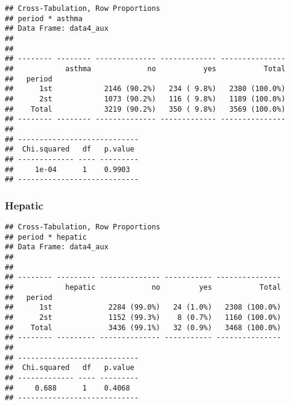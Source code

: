 \documentclass[
]{article}
\newenvironment{Shaded}{\begin{snugshade}}{\end{snugshade}}
\newcommand{\DataTypeTok}[1]{\textcolor[rgb]{0.13,0.29,0.53}{#1}}
\newcommand{\KeywordTok}[1]{\textcolor[rgb]{0.13,0.29,0.53}{\textbf{#1}}}
\newcommand{\NormalTok}[1]{#1}
\newcommand{\OperatorTok}[1]{\textcolor[rgb]{0.81,0.36,0.00}{\textbf{#1}}}
\newcommand{\OtherTok}[1]{\textcolor[rgb]{0.56,0.35,0.01}{#1}}
\newcommand{\StringTok}[1]{\textcolor[rgb]{0.31,0.60,0.02}{#1}}
\begin{document}
\begin{Shaded}
\end{Shaded}

\begin{verbatim}
## Cross-Tabulation, Row Proportions  
## period * asthma  
## Data Frame: data4_aux  
## 
## 
## -------- -------- -------------- ------------- ---------------
##            asthma             no           yes           Total
##   period                                                      
##      1st            2146 (90.2%)   234 ( 9.8%)   2380 (100.0%)
##      2st            1073 (90.2%)   116 ( 9.8%)   1189 (100.0%)
##    Total            3219 (90.2%)   350 ( 9.8%)   3569 (100.0%)
## -------- -------- -------------- ------------- ---------------
## 
## ----------------------------
##  Chi.squared   df   p.value 
## ------------- ---- ---------
##     1e-04      1    0.9903  
## ----------------------------
\end{verbatim}

\hypertarget{hepatic-2}{%
\subsubsection{Hepatic}\label{hepatic-2}}

\begin{Shaded}
\end{Shaded}

\begin{verbatim}
## Cross-Tabulation, Row Proportions  
## period * hepatic  
## Data Frame: data4_aux  
## 
## 
## -------- --------- -------------- ----------- ---------------
##            hepatic             no         yes           Total
##   period                                                     
##      1st             2284 (99.0%)   24 (1.0%)   2308 (100.0%)
##      2st             1152 (99.3%)    8 (0.7%)   1160 (100.0%)
##    Total             3436 (99.1%)   32 (0.9%)   3468 (100.0%)
## -------- --------- -------------- ----------- ---------------
## 
## ----------------------------
##  Chi.squared   df   p.value 
## ------------- ---- ---------
##     0.688      1    0.4068  
## ----------------------------
\end{verbatim}
\end{document}
